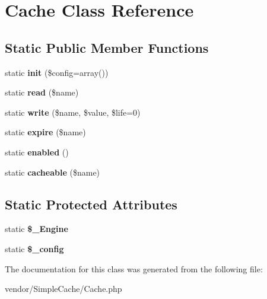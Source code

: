 \hypertarget{classCache}{
\section{Cache Class Reference}
\label{classCache}
}
\subsection*{Static Public Member Functions}
\begin{DoxyCompactItemize}
\item 
\hypertarget{classCache_a81921ae55041a0c8c5048e94139d6d8a}{
static {\bfseries init} (\$config=array())}
\label{classCache_a81921ae55041a0c8c5048e94139d6d8a}

\item 
\hypertarget{classCache_ad2bc9a7271f81f95ce5d15c34b19c3cd}{
static {\bfseries read} (\$name)}
\label{classCache_ad2bc9a7271f81f95ce5d15c34b19c3cd}

\item 
\hypertarget{classCache_a544e29c7d7cb8ec0b97631f389b73e68}{
static {\bfseries write} (\$name, \$value, \$life=0)}
\label{classCache_a544e29c7d7cb8ec0b97631f389b73e68}

\item 
\hypertarget{classCache_a58b7dd05298fb4b5dd90af47114442bb}{
static {\bfseries expire} (\$name)}
\label{classCache_a58b7dd05298fb4b5dd90af47114442bb}

\item 
\hypertarget{classCache_aa8c719f155cc6c42bd4fe2e69aaf2f32}{
static {\bfseries enabled} ()}
\label{classCache_aa8c719f155cc6c42bd4fe2e69aaf2f32}

\item 
\hypertarget{classCache_a5d81fd5280cf48ac4c4b743c05e8ca08}{
static {\bfseries cacheable} (\$name)}
\label{classCache_a5d81fd5280cf48ac4c4b743c05e8ca08}

\end{DoxyCompactItemize}
\subsection*{Static Protected Attributes}
\begin{DoxyCompactItemize}
\item 
\hypertarget{classCache_a4867e1cc5c61cfc49a8a8724b96edb00}{
static {\bfseries \$\_\-Engine}}
\label{classCache_a4867e1cc5c61cfc49a8a8724b96edb00}

\item 
\hypertarget{classCache_acd54fe484a38528524d4f4c5fecae2c6}{
static {\bfseries \$\_\-config}}
\label{classCache_acd54fe484a38528524d4f4c5fecae2c6}

\end{DoxyCompactItemize}


The documentation for this class was generated from the following file:\begin{DoxyCompactItemize}
\item 
vendor/SimpleCache/Cache.php\end{DoxyCompactItemize}
